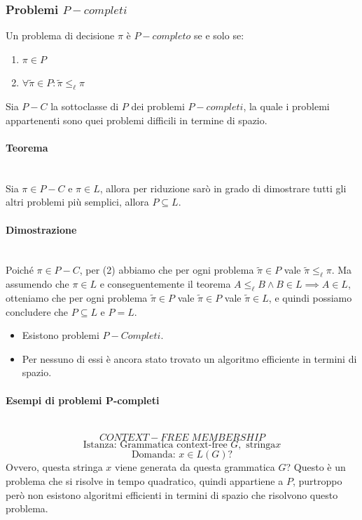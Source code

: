\documentclass{article}
\begin{document}
\subsubsection{Problemi $P-completi$}
Un problema di decisione $\pi$ è $P-completo$ se e solo se:
\begin{enumerate}
    \item $\pi\in P$
    \item $\forall\tilde{\pi}\in P:\tilde{\pi}\leq_{\ell}\pi$
\end{enumerate}
Sia $P-C$ la sottoclasse di $P$ dei problemi $P-completi$, la quale i problemi appartenenti
sono quei problemi difficili in termine di spazio.

\paragraph{Teorema}\mbox{}\\
Sia $\pi\in P-C$ e $\pi\in L$, allora per riduzione sarò in grado di dimostrare
tutti gli altri problemi più semplici, allora $P\subseteq L$.

\paragraph{Dimostrazione}\mbox{}\\
Poiché $\pi\in P-C$, per (2) abbiamo che per ogni problema $\tilde{\pi}\in P$ vale
$\tilde{\pi}\leq_{\ell}\pi$. Ma assumendo che $\pi\in L$ e conseguentemente il teorema
$A\leq_{\ell}B\land B\in L\implies A\in L$, otteniamo che per ogni problema $\tilde{\pi}\in P$
vale $\tilde{\pi}\in P$ vale $\tilde{\pi}\in L$, e quindi possiamo concludere che $P\subseteq L$
e $P=L$.

\begin{itemize}
    \item Esistono problemi $P-Completi$.
    \item Per nessuno di essi è ancora stato trovato un algoritmo efficiente in termini
    di spazio.
\end{itemize}

\paragraph{Esempi di problemi P-completi}\mbox{}\\
$$CONTEXT-FREE\;MEMBERSHIP$$
$$\text{Istanza: Grammatica context-free }G,\text{ stringa}x$$
$$\text{Domanda: }x\in L(G)?$$
Ovvero, questa stringa $x$ viene generata da questa grammatica $G$? Questo è un problema
che si risolve in tempo quadratico, quindi appartiene a $P$, purtroppo però non esistono
algoritmi efficienti in termini di spazio che risolvono questo problema.
\end{document}
